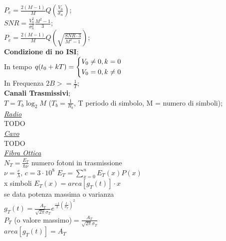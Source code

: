 \documentclass[a4paper]{article}
\begin{document}
\begin{multicols*}{3}
$P_e = \frac{2(M-1)}{M}Q(\frac{V_0}{\sigma_n})$;\\
$SNR = \frac{V_0^2}{\sigma_n^2}\frac{M^2-1}{3}$; \\
$P_e = \frac{2(M-1)}{M}Q(\sqrt{\frac{SNR \cdot 3}{M^2-1}})$; \\
\textbf{Condizione di no ISI}; \\
In tempo
 $ q(t_{0}+kT)=
\begin{dcases}
    V_0\ne0 , k=0  \\
    V_0=0, k\ne0  \\
\end{dcases}
$ \\
In Frequenza
$2B >= \frac{1}{T}$; \\
\textbf{Canali Trasmissivi}; \\
$T=T_b \log_{2}{M}$ ($T_b = \frac{1}{R_b}$, T periodo di simbolo,
M = numero di simboli);\\
\underline{\textit{Radio}} \\
TODO \\
\underline{\textit{Cavo}} \\
TODO \\
\underline{\textit{Fibra Ottica}} \\
$N_T = \frac{E_T}{\hbar\nu}$ numero fotoni in trasmissione \\
$\nu = \frac{c}{\lambda}$, $c=3\cdot10^8$ 
$E_T = \sum_{x=0}^{n}{E_T(x)P(x)}$ \\ x simboli 
$E_T(x) = area[g_T(t)]\cdot x$ \\
se data potenza massima o varianza \\
$g_T(t)=\frac{A_T}{\sqrt{2\pi}\sigma_T}e^{\frac{-1}{2}(\frac{t}{\sigma_T})^2}$
\\ $P_T$ (o valore massimo)$= \frac{A_T}{\sqrt{2\pi}\sigma_T}$ \\
$area[g_T(t)] = A_T$ \\
\end{multicols*}
\end{document}
